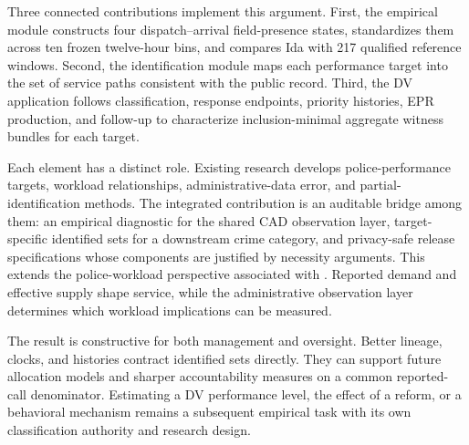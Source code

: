 \documentclass[11pt]{article}
\begin{document}
Three connected contributions implement this argument. First, the empirical module constructs four dispatch--arrival field-presence states, standardizes them across ten frozen twelve-hour bins, and compares Ida with 217 qualified reference windows. Second, the identification module maps each performance target into the set of service paths consistent with the public record. Third, the DV application follows classification, response endpoints, priority histories, EPR production, and follow-up to characterize inclusion-minimal aggregate witness bundles for each target.

Each element has a distinct role. Existing research develops police-performance targets, workload relationships, administrative-data error, and partial-identification methods. The integrated contribution is an auditable bridge among them: an empirical diagnostic for the shared CAD observation layer, target-specific identified sets for a downstream crime category, and privacy-safe release specifications whose components are justified by necessity arguments. This extends the police-workload perspective associated with \citet{Beland2026}. Reported demand and effective supply shape service, while the administrative observation layer determines which workload implications can be measured.

The result is constructive for both management and oversight. Better lineage, clocks, and histories contract identified sets directly. They can support future allocation models and sharper accountability measures on a common reported-call denominator. Estimating a DV performance level, the effect of a reform, or a behavioral mechanism remains a subsequent empirical task with its own classification authority and research design.
\end{document}
